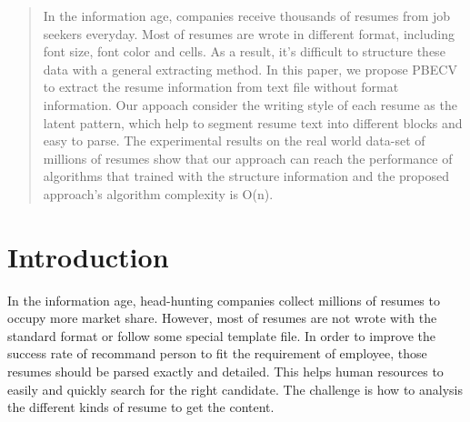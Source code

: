 \documentclass{acm_proc_article-sp}
\begin{document}
\maketitle
\begin{abstract}


In the information age, companies receive thousands of resumes from job seekers everyday. 
Most of resumes are wrote in different format, including font size, font color and cells. %
As a result, it's difficult to structure these data with a general extracting method. 
In this paper, we propose PBECV to extract the resume information from text file without format information. 
Our appoach consider the writing style of each resume as the latent pattern, which help to segment resume text into different blocks and easy to parse. 
The experimental results on the real world data-set of millions of resumes show that our approach can reach the performance of algorithms that trained with the structure information and the proposed approach's algorithm complexity is O(n).

\end{abstract}




\section{Introduction}

In the information age, head-hunting companies collect millions of resumes to occupy more market share.
However, most of resumes are not wrote with the standard format or follow some special template file.
In order to improve the success rate of recommand person to fit the requirement of employee, those resumes should be parsed exactly and detailed.
This helps human resources to easily and quickly search for the right candidate.
The challenge is how to analysis the different kinds of resume to get the content.
\end{document}
